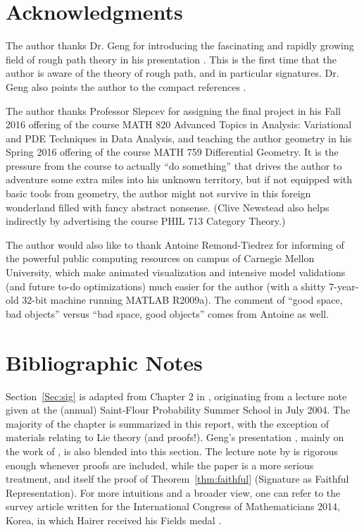 \documentclass[fleqn]{article}
\theoremstyle{definition}
\theoremstyle{remark}
\begin{document}
{}
\section*{Acknowledgments}
The author thanks Dr. Geng for introducing the fascinating and rapidly growing field of rough path theory in his presentation \cite{Geng2016CCF}. This is the first time that the author is aware of the theory of rough path, and in particular signatures. Dr. Geng also points the author to the compact references \citet{lyons2007differential,lyons2014HFT}.

\par
The author thanks Professor Slepcev for assigning the final project in his Fall 2016 offering of the course MATH 820 Advanced Topics in Analysis: Variational and PDE Techniques in Data Analysis, and teaching the author geometry in his Spring 2016 offering of the course MATH 759 Differential Geometry. It is the pressure from the course to actually ``do something'' that drives the author to adventure some extra miles into his unknown territory, but if not equipped with basic tools from geometry, the author might not survive in this foreign wonderland filled with fancy abstract nonsense. (Clive Newstead also helps indirectly by advertising the course {PHIL 713} Category Theory.)

\par
The author would also like to thank Antoine Remond-Tiedrez for informing of the powerful public computing resources on campus of Carnegie Mellon University, which make animated visualization and intensive model validations (and future to-do optimizations) much easier for the author (with a shitty 7-year-old 32-bit machine running MATLAB R2009a). The comment of ``good space, bad objects'' versus ``bad space, good objects'' comes from Antoine as well.

{}
\section*{Bibliographic Notes}
Section~\ref{Sec:sig} is adapted from Chapter 2 in \citet{lyons2007differential}, originating from a lecture note given at the (annual) Saint-Flour Probability Summer School in July 2004. The majority of the chapter is summarized in this report, with the exception of materials relating to Lie theory (and proofs!). Geng's presentation \cite{Geng2016CCF}, mainly on the work of \citet{Hambly2005}, is also blended into this section. The lecture note by \citet{lyons2007differential} is rigorous enough whenever proofs are included, while the paper \citet{Hambly2005} is a more serious treatment, and itself the proof of Theorem~\ref{thm:faithful} (Signature as Faithful Representation). For more intuitions and a broader view, one can refer to the survey article \citet{lyons2014ICM} written for the International Congress of Mathematicians 2014, Korea, in which Hairer received his Fields medal \label{fields}.
\end{document}
